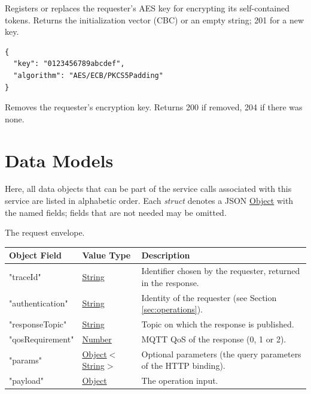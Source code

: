 \documentclass[a4paper]{arrowhead}
\newcommand{\oref}[1]{{\textcolor{ArrowheadBlue}{\hyperref[sec:operations:#1]{#1}}}}
\newcommand{\pref}[1]{{\textcolor{ArrowheadGrey}{\hyperref[sec:model:primitives:#1]{#1}}}}
\begin{document}
Registers or replaces the requester's AES key for encrypting its self-contained tokens. Returns the initialization vector (CBC) or an empty string; 201 for a new key.

\begin{lstlisting}[caption={Payload of an \oref{register-encryption-key} request.}]
{
  "key": "0123456789abcdef",
  "algorithm": "AES/ECB/PKCS5Padding"
}
\end{lstlisting}


Removes the requester's encryption key. Returns 200 if removed, 204 if there was none.

\newpage

\section{Data Models}
\label{sec:model}

Here, all data objects that can be part of the service calls associated with this service are listed in alphabetic order.
Each \textit{struct} denotes a JSON \pref{Object} with the named fields; fields that are not needed may be omitted.


The request envelope.

\noindent\begin{tabularx}{\textwidth}{| p{4.25cm} | p{3.5cm} | X |} \hline
\rowcolor{gray!33} Object Field & Value Type & Description \\ \hline
"traceId" & \pref{String} & Identifier chosen by the requester, returned in the response. \\ \hline
"authentication" & \pref{String} & Identity of the requester (see Section \ref{sec:operations}). \\ \hline
"responseTopic" & \pref{String} & Topic on which the response is published. \\ \hline
"qosRequirement" & \pref{Number} & MQTT QoS of the response (0, 1 or 2). \\ \hline
"params" & \pref{Object}$<$\pref{String}$>$ & Optional parameters (the query parameters of the HTTP binding). \\ \hline
"payload" & \pref{Object} & The operation input. \\ \hline
\end{tabularx}
\end{document}
